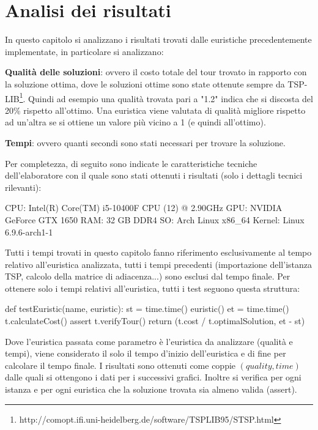\documentclass[a4paper,12pt]{report}
\begin{document}
\chapter{Analisi dei risultati}
In questo capitolo si analizzano i risultati trovati dalle euristiche precedentemente implementate, in particolare si analizzano:
\begin{legal}
  \item {\bf Qualità delle soluzioni}: ovvero il costo totale del tour trovato in rapporto con la soluzione ottima, dove le soluzioni ottime sono state ottenute sempre da TSP-LIB\footnote{http://comopt.ifi.uni-heidelberg.de/software/TSPLIB95/STSP.html}. Quindi ad esempio una qualità trovata pari a "1.2" indica che si discosta del 20\% rispetto all'ottimo. Una euristica viene valutata di qualità migliore rispetto ad un'altra se si ottiene un valore più vicino a 1 (e quindi all'ottimo).
  \item {\bf Tempi}: ovvero quanti secondi sono stati necessari per trovare la soluzione.
\end{legal}
Per completezza, di seguito sono indicate le caratteristiche tecniche dell'elaboratore con il quale sono stati ottenuti i risultati (solo i dettagli tecnici rilevanti):
\begin{myverbatim}
CPU:    Intel(R) Core(TM) i5-10400F CPU (12) @ 2.90GHz
GPU:    NVIDIA GeForce GTX 1650
RAM:    32 GB DDR4
SO:     Arch Linux x86_64
Kernel: Linux 6.9.6-arch1-1
\end{myverbatim}
Tutti i tempi trovati in questo capitolo fanno riferimento esclusivamente al tempo relativo all'euristica analizzata, tutti i tempi precedenti (importazione dell'istanza TSP, calcolo della matrice di adiacenza...) sono esclusi dal tempo finale. Per ottenere solo i tempi relativi all'euristica, tutti i test seguono questa struttura:
\begin{python}
def testEuristic(name, euristic):
  st = time.time()
  euristic()
  et = time.time()
  t.calculateCost()
  assert t.verifyTour()
  return (t.cost / t.optimalSolution, et - st)
\end{python}
Dove l'euristica passata come parametro è l'euristica da analizzare (qualità e tempi), viene considerato il solo il tempo d'inizio dell'euristica e di fine per calcolare il tempo finale. I risultati sono ottenuti come coppie $(quality, time)$ dalle quali si ottengono i dati per i successivi grafici. Inoltre si verifica per ogni istanza e per ogni euristica che la soluzione trovata sia almeno valida (assert).
\end{document}
